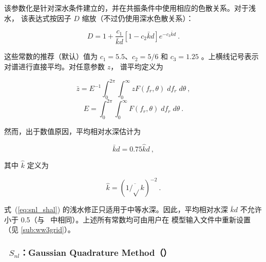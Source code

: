 该参数化是针对深水条件建立的，并在共振条件中使用相应的色散关系。对于浅水，
该表达式按因子 $D$ 缩放（不过仍使用深水色散关系）：


\begin{equation}
D = 1 + \frac{c_1}{\bar{k}d} \left [ 1 - c_2 \bar{k} d
\right ] e^{-c_3 \bar{k} d} \: . \label{eq:snl_shal}
\end{equation}

\noindent
这些常数的推荐（默认）值为 $c_1=5.5$、$c_2=5/6$ 和 $c_3=1.25$
\citep{art:Hea85a}。上横线记号表示对谱进行直接平均。对任意参数 $z$，
谱平均定义为


\begin{equation}
\bar{z} = E^{-1} \int_{0}^{2\pi} \int_{0}^{\infty}
z F(f_r,\theta) \; d f_r \; d\theta \: , \label{eq:zbar}
\end{equation}
\begin{equation}
E = \int_{0}^{2\pi} \int_{0}^{\infty}
F(f_r,\theta) \; d f_r \; d\theta \: . \label{eq:etot}
\end{equation}

\noindent
然而，出于数值原因，平均相对水深估计为


\begin{equation}
\bar{k} d = 0.75 \hat{k} d \: , \label{eq:kd_num}
\end{equation}

\noindent
其中 $\hat{k}$ 定义为

\begin{equation}
\hat{k} = \left ( \overline{1/\sqrt{}k} \right )^{-2} \: .
\label{eq:k_hat}
\end{equation}

\noindent
式~(\ref{eq:snl_shal}) 的浅水修正只适用于中等水深。因此，平均相对水深
$\bar{k}d$ 不允许小于 0.5（与 \wam\ 中相同）。上述所有常数均可由用户在
模型输入文件中重新设置（见 \para\ref{sub:ww3grid}）。

\vsssub
\subsubsection{~$S_{nl}$：Gaussian Quadrature Method（\dia）} \label{sec:GQM}
\vsssub

